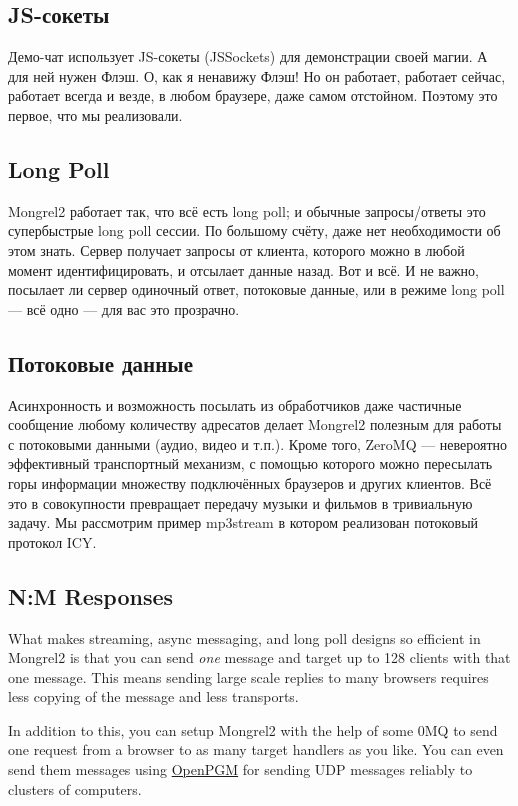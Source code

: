 \subsection{JS-сокеты}

Демо-чат использует JS-сокеты (JSSockets) для демонстрации своей магии. А для
ней нужен Флэш. О, как я ненавижу Флэш! Но он работает, работает сейчас,
работает всегда и везде, в любом браузере, даже самом отстойном. Поэтому это
первое, что мы реализовали.

\subsection{Long Poll}

Mongrel2 работает так, что всё есть long poll; и обычные запросы/ответы это
супербыстрые long poll сессии. По большому счёту, даже нет необходимости об этом
знать. Сервер получает запросы от клиента, которого можно в любой момент
идентифицировать, и отсылает данные назад. Вот и всё. И не важно, посылает ли
сервер одиночный ответ, потоковые данные, или в режиме long poll --- всё одно
--- для вас это прозрачно.

\subsection{Потоковые данные}

Асинхронность и возможность посылать из обработчиков даже частичные сообщение любому количеству
адресатов делает Mongrel2 полезным для работы с потоковыми данными (аудио,
видео и т.п.). Кроме того, ZeroMQ --- невероятно эффективный транспортный
механизм, с помощью которого можно пересылать горы информации множеству
подключённых браузеров и других клиентов. Всё это в совокупности превращает
передачу музыки и фильмов в тривиальную задачу. Мы рассмотрим пример mp3stream в
котором реализован потоковый протокол ICY. 

\subsection{N:M Responses}

What makes streaming, async messaging, and long poll designs so efficient in Mongrel2 is that you can send
\emph{one} message and target up to 128 clients with that one message.  This means sending large scale replies
to many browsers requires less copying of the message and less transports.

In addition to this, you can setup Mongrel2 with the help of some 0MQ to send
one request from a browser to as many target handlers as you like.  You can
even send them messages using \href{http://code.google.com/p/openpgm/}{OpenPGM}
for sending UDP messages reliably to clusters of computers.

